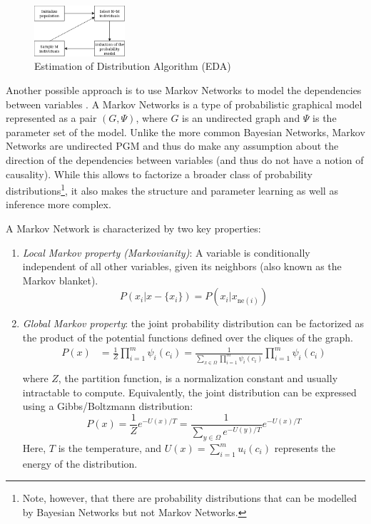 \begin{figure}
    \centering
    \includegraphics[width=0.3\textwidth]{img/eda.png}
    \caption{Estimation of Distribution Algorithm (EDA)}
    \label{fig:eda}
\end{figure}

Another possible approach is to use Markov Networks to model the dependencies between variables \cite{shakya_markov_2012}. A Markov Networks is a type of probabilistic graphical model represented as a pair $(G, \Psi)$, where $G$ is an undirected graph and $\Psi$ is the parameter set of the model. Unlike the more common Bayesian Networks, Markov Networks are undirected PGM and thus do make any assumption about the direction of the dependencies between variables (and thus do not have a notion of causality). While this allows to factorize a broader class of probability distributions\footnote{Note, however, that there are probability distributions that can be modelled by Bayesian Networks but not Markov Networks.}, it also makes the structure and parameter learning as well as inference more complex.

A Markov Network is characterized by two key properties:
\begin{enumerate}
    \item \textit{Local Markov property (Markovianity)}: A variable is conditionally independent of all other variables, given its neighbors (also known as the Markov blanket).
          \begin{equation*}
              P(x_i | x - \{x_i\}) = P(x_i | x_{\text{ne}(i)})
          \end{equation*}

    \item \textit{Global Markov property}: the joint probability distribution can be factorized as the product of the potential functions defined over the cliques of the graph.
          \begin{align*}
              P(x) & = \frac{1}{Z} \prod_{i=1}^m \psi_i(c_i) = \frac{1}{\sum_{x \in \Omega} \prod_{i=1}^m \psi_i(c_i)} \prod_{i=1}^m \psi_i(c_i) \\
          \end{align*}
          where $Z$, the partition function, is a normalization constant and usually intractable to compute. Equivalently, the joint distribution can be expressed using a Gibbs/Boltzmann distribution:
          \begin{equation*}
              P(x) = \frac{1}{Z} e^{-U(x)/T} = \frac{1}{\sum_{y \in \Omega} e^{-U(y)/T}} e^{-U(x)/T}
          \end{equation*}
          Here, $T$ is the temperature, and $U(x)=\sum_{i=1}^m u_i(c_i)$ represents the energy of the distribution.
\end{enumerate}

